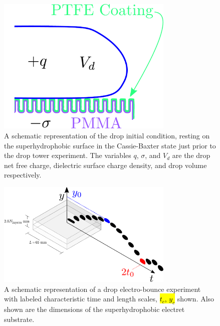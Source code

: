 \documentclass[12pt,a4paper,oneside]{book}
\begin{document}
\begin{figure}[ht]
 \centering
 \includegraphics[width=0.75\textwidth]{../figures/schematic.pdf}
 \caption{A schematic representation of the drop initial condition, resting on the superhydrophobic surface in the Cassie-Baxter state just prior to the drop tower experiment. The variables $q$, $\sigma$, and $V_d$ are the drop net free charge, dielectric surface charge density, and drop volume respectively.\label{fig:schematic}}
\end{figure}
\begin{figure}[ht]
 \centering
 \includegraphics[width=0.75\textwidth]{../figures/apparatus0.pdf}
 \caption{A schematic representation of a drop electro-bounce experiment with labeled characteristic time and length scales, \hl{$t_c$, $y_c$} shown. Also shown are the dimensions of the superhydrophobic electret substrate.\label{fig:apparatus0}}
\end{figure}
\end{document}
